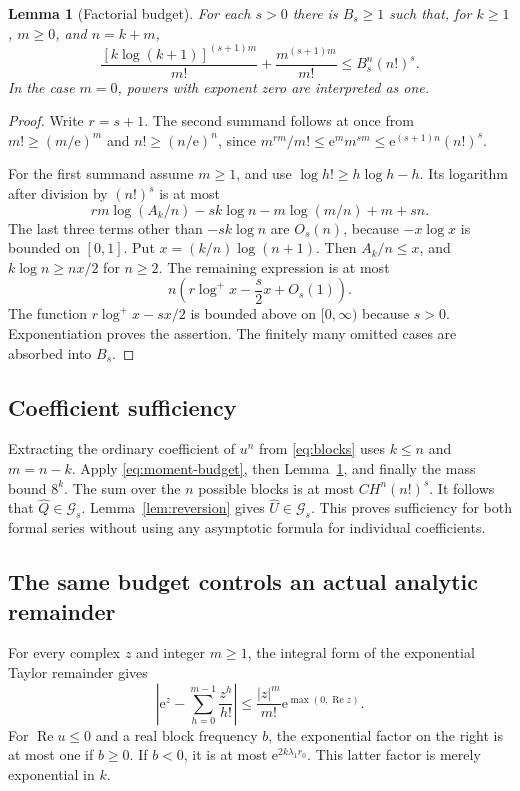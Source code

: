 \documentclass[11pt,a4paper]{article}
\numberwithin{equation}{section}
\newtheorem{lemma}[theorem]{Lemma}
\theoremstyle{definition}
\theoremstyle{remark}
\theoremstyle{definition}
\newcommand{\U}{\widehat U}
\newcommand{\Q}{\widehat Q}
\newcommand{\Gev}{\mathcal G}
\newcommand{\e}{\mathrm e}
\newcommand{\Ree}{\operatorname{Re}}
\begin{document}
\begin{lemma}[Factorial budget]
\label{lem:factorial-budget}
For each $s>0$ there is $B_s\ge1$ such that, for $k\ge1$, $m\ge0$, and
$n=k+m$,
\begin{equation}
 \frac{[k\log(k+1)]^{(s+1)m}}{m!}
 +\frac{m^{(s+1)m}}{m!}
 \le B_s^n(n!)^s.
 \label{eq:factorial-budget}
\end{equation}
In the case $m=0$, powers with exponent zero are interpreted as one.
\end{lemma}
\begin{proof}
Write $r=s+1$. The second summand follows at once from
$m!\ge(m/\e)^m$ and $n!\ge(n/\e)^n$, since
$m^{rm}/m!\le\e^m m^{sm}\le\e^{(s+1)n}(n!)^s$.

For the first summand assume $m\ge1$, and use
$\log h!\ge h\log h-h$. Its logarithm after division by $(n!)^s$ is
at most
\[
 rm\log(A_k/n)-sk\log n-m\log(m/n)+m+sn.
\]
The last three terms other than $-sk\log n$ are $O_s(n)$, because
$-x\log x$ is bounded on $[0,1]$. Put
$x=(k/n)\log(n+1)$. Then $A_k/n\le x$, and
$k\log n\ge nx/2$ for $n\ge2$. The remaining expression is at most
\[
 n\left(r\log^+x-\frac{s}{2}x+O_s(1)\right).
\]
The function $r\log^+x-sx/2$ is bounded above on $[0,\infty)$ because
$s>0$. Exponentiation proves the assertion. The finitely many omitted
cases are absorbed into $B_s$.
\end{proof}

\subsection{Coefficient sufficiency}
Extracting the ordinary coefficient of $u^n$ from \eqref{eq:blocks}
uses $k\le n$ and $m=n-k$. Apply \eqref{eq:moment-budget}, then
Lemma~\ref{lem:factorial-budget}, and finally the mass bound $8^k$.
The sum over the $n$ possible blocks is at most $C H^n(n!)^s$.
It follows that $\Q\in\Gev_s$. Lemma~\ref{lem:reversion} gives
$\U\in\Gev_s$. This proves sufficiency for both formal series without
using any asymptotic formula for individual coefficients.

\subsection{The same budget controls an actual analytic remainder}
For every complex $z$ and integer $m\ge1$, the integral form of the
exponential Taylor remainder gives
\begin{equation}
 \left|\e^z-\sum_{h=0}^{m-1}\frac{z^h}{h!}\right|
 \le\frac{|z|^m}{m!}\e^{\max(0,\Ree z)}.
 \label{eq:exp-remainder}
\end{equation}
For $\Ree u\le0$ and a real block frequency $b$, the exponential factor
on the right is at most one if $b\ge0$. If $b<0$, it is at most
$\e^{2k\lambda_1r_0}$. This latter factor is merely exponential in $k$.
\end{document}
